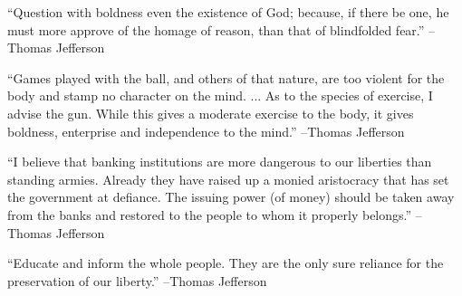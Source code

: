 \documentclass{article}%
\begin{document}
\linebreak%
\vspace{1mm}%
\begin{minipage}{\textwidth}%
\flushleft%
“Question with boldness even the existence of God; because, if there be one, he must more approve of the homage of reason, than that of blindfolded fear.”%
\linebreak%
\vspace{1mm}%
–Thomas Jefferson%
\linebreak%
\vspace{1mm}%
\end{minipage}%
\linebreak%
\vspace{1mm}%
\begin{minipage}{\textwidth}%
\flushleft%
“Games played with the ball, and others of that nature, are too violent for the body and stamp no character on the mind. ... As to the species of exercise, I advise the gun. While this gives a moderate exercise to the body, it gives boldness, enterprise and independence to the mind.”%
\linebreak%
\vspace{1mm}%
–Thomas Jefferson%
\linebreak%
\vspace{1mm}%
\end{minipage}%
\linebreak%
\vspace{1mm}%
\begin{minipage}{\textwidth}%
\flushleft%
“I believe that banking institutions are more dangerous to our liberties than standing armies. Already they have raised up a monied aristocracy that has set the government at defiance. The issuing power (of money) should be taken away from the banks and restored to the people to whom it properly belongs.”%
\linebreak%
\vspace{1mm}%
–Thomas Jefferson%
\linebreak%
\vspace{1mm}%
\end{minipage}%
\linebreak%
\vspace{1mm}%
\begin{minipage}{\textwidth}%
\flushleft%
“Educate and inform the whole people. They are the only sure reliance for the preservation of our liberty.”%
\linebreak%
\vspace{1mm}%
–Thomas Jefferson%
\linebreak%
\vspace{1mm}%
\end{minipage}%
\end{document}
